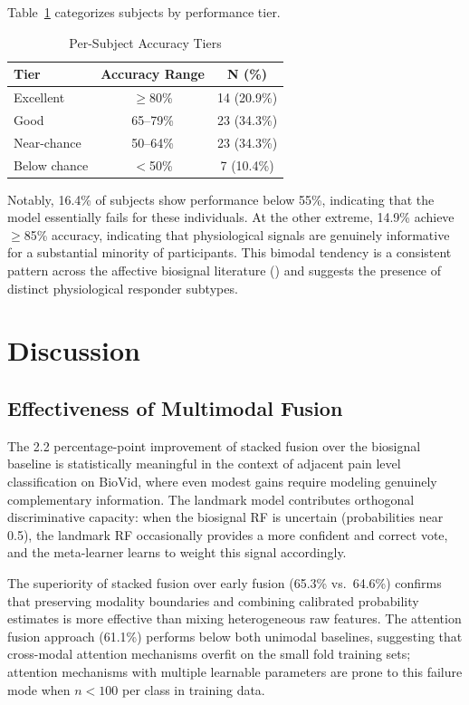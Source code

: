 \documentclass[10pt, twocolumn]{article}
\begin{document}
Table~\ref{tab:tiers} categorizes subjects by performance tier.

\begin{table}[ht]
\centering
\caption{Per-Subject Accuracy Tiers}
\label{tab:tiers}
\small
\begin{tabular}{lcc}
\toprule
\textbf{Tier} & \textbf{Accuracy Range} & \textbf{N (\%)} \\
\midrule
Excellent    & $\geq$80\%   & 14 (20.9\%) \\
Good         & 65--79\%     & 23 (34.3\%) \\
Near-chance  & 50--64\%     & 23 (34.3\%) \\
Below chance & $<$50\%      & 7 (10.4\%) \\
\bottomrule
\end{tabular}
\end{table}

Notably, 16.4\% of subjects show performance below 55\%, indicating that the model
essentially fails for these individuals. At the other extreme, 14.9\% achieve $\geq$85\%
accuracy, indicating that physiological signals are genuinely informative for a substantial
minority of participants. This bimodal tendency is a consistent pattern across the affective
biosignal literature (\cite{Gkikas2023}) and suggests the presence of distinct
physiological responder subtypes.

\section{Discussion}
\label{sec:discussion}

\subsection{Effectiveness of Multimodal Fusion}

The 2.2 percentage-point improvement of stacked fusion over the biosignal baseline is
statistically meaningful in the context of adjacent pain level classification on BioVid,
where even modest gains require modeling genuinely complementary information. The landmark
model contributes orthogonal discriminative capacity: when the biosignal RF is uncertain
(probabilities near 0.5), the landmark RF occasionally provides a more confident and
correct vote, and the meta-learner learns to weight this signal accordingly.

The superiority of stacked fusion over early fusion (65.3\% vs.\ 64.6\%) confirms that
preserving modality boundaries and combining calibrated probability estimates is more
effective than mixing heterogeneous raw features. The attention fusion approach (61.1\%)
performs below both unimodal baselines, suggesting that cross-modal attention mechanisms
overfit on the small fold training sets; attention mechanisms with multiple learnable
parameters are prone to this failure mode when $n < 100$ per class in training data.
\end{document}
